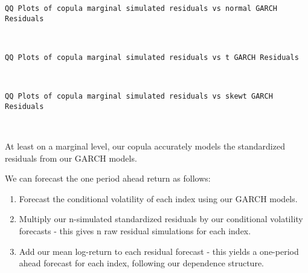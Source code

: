 \documentclass[11pt]{article}
\providecommand{\tightlist}{%
      \setlength{\itemsep}{0pt}\setlength{\parskip}{0pt}}
\begin{document}
    \begin{Verbatim}[commandchars=\\\{\}]
QQ Plots of copula marginal simulated residuals vs normal GARCH Residuals
    \end{Verbatim}

    \begin{center}
    \end{center}
    { \hspace*{\fill} \\}
    
    \begin{Verbatim}[commandchars=\\\{\}]
QQ Plots of copula marginal simulated residuals vs t GARCH Residuals
    \end{Verbatim}

    \begin{center}
    \end{center}
    { \hspace*{\fill} \\}
    
    \begin{Verbatim}[commandchars=\\\{\}]
QQ Plots of copula marginal simulated residuals vs skewt GARCH Residuals
    \end{Verbatim}

    \begin{center}
    \end{center}
    { \hspace*{\fill} \\}
    
    At least on a marginal level, our copula accurately models the
standardized residuals from our GARCH models.

We can forecast the one period ahead return as follows:

\begin{enumerate}
\def\labelenumi{\arabic{enumi}.}
\tightlist
\item
  Forecast the conditional volatility of each index using our GARCH
  models.
\item
  Multiply our n-simulated standardized residuals by our conditional
  volatility forecasts - this gives n raw residual simulations for each
  index.
\item
  Add our mean log-return to each residual forecast - this yields a
  one-period ahead forecast for each index, following our dependence
  structure.
\end{enumerate}
\end{document}
